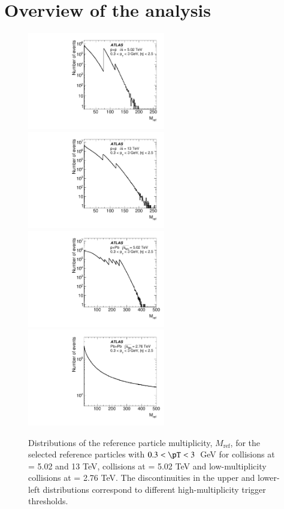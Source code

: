 \documentclass[cernpreprint,texlive=2014,txfonts,UKenglish]{latex/atlasdoc}
\begin{document}
\section{Overview of the analysis}
\label{sec:analysis}
\begin{figure}[ht!]
\begin{center}
\includegraphics[width=60mm]{fig_01a.pdf}
\includegraphics[width=60mm]{fig_01b.pdf}
\includegraphics[width=60mm]{fig_01c.pdf}
\includegraphics[width=60mm]{fig_01d.pdf}
\caption{Distributions of the reference particle multiplicity, $M_{\mathrm{ref}}$, for the selected reference particles with $ 0.3 < \pT <3$~GeV for \pp collisions at \sqs= 5.02 and 13 TeV, \pPb collisions at \sqn= 5.02 TeV and low-multiplicity \PbPb collisions at \sqn= 2.76 TeV. The discontinuities in the upper and lower-left distributions correspond to different high-multiplicity trigger thresholds.}
\label{fig:ntrkAllsystems033} 
\end{center}
\end{figure} 
\end{document}
